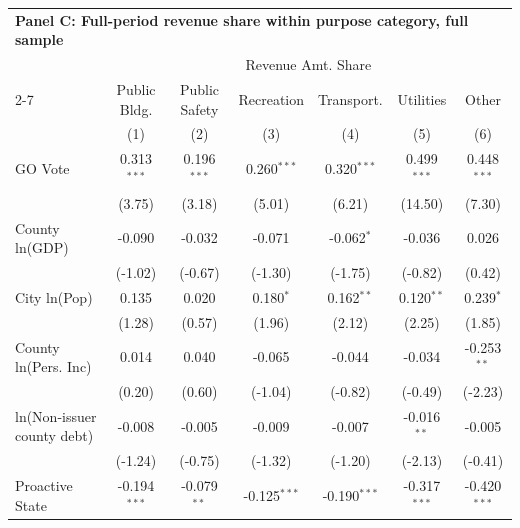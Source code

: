 \begingroup
\small
\centering
\begin{tabular*}{\textwidth}{@{\extracolsep{\fill}}lcccccc}
\multicolumn{7}{l}{\textbf{Panel C: Full-period revenue share within purpose category, full sample}}\\

\addlinespace
   \toprule
    & \multicolumn{6}{c}{Revenue Amt. Share}\\
   \cmidrule(lr){2-7}
                              & Public Bldg.   & Public Safety & Recreation     & Transport.     & Utilities      & Other \\   
                              & (1)            & (2)           & (3)            & (4)            & (5)            & (6)\\  
   \midrule 
   GO Vote                    & 0.313$^{***}$  & 0.196$^{***}$ & 0.260$^{***}$  & 0.320$^{***}$  & 0.499$^{***}$  & 0.448$^{***}$\\   
                              & (3.75)        & (3.18)       & (5.01)        & (6.21)        & (14.50)       & (7.30)\\   
   County ln(GDP)             & -0.090         & -0.032        & -0.071         & -0.062$^{*}$   & -0.036         & 0.026\\   
                              & (-1.02)       & (-0.67)      & (-1.30)       & (-1.75)       & (-0.82)       & (0.42)\\   
   City ln(Pop)               & 0.135          & 0.020         & 0.180$^{*}$    & 0.162$^{**}$   & 0.120$^{**}$   & 0.239$^{*}$\\   
                              & (1.28)        & (0.57)       & (1.96)        & (2.12)        & (2.25)        & (1.85)\\   
   County ln(Pers. Inc)       & 0.014          & 0.040         & -0.065         & -0.044         & -0.034         & -0.253$^{**}$\\   
                              & (0.20)        & (0.60)       & (-1.04)       & (-0.82)       & (-0.49)       & (-2.23)\\   
   ln(Non-issuer county debt) & -0.008         & -0.005        & -0.009         & -0.007         & -0.016$^{**}$  & -0.005\\   
                              & (-1.24)       & (-0.75)      & (-1.32)       & (-1.20)       & (-2.13)       & (-0.41)\\   
   Proactive State            & -0.194$^{***}$ & -0.079$^{**}$ & -0.125$^{***}$ & -0.190$^{***}$ & -0.317$^{***}$ & -0.420$^{***}$\\   

\end{tabular*}
